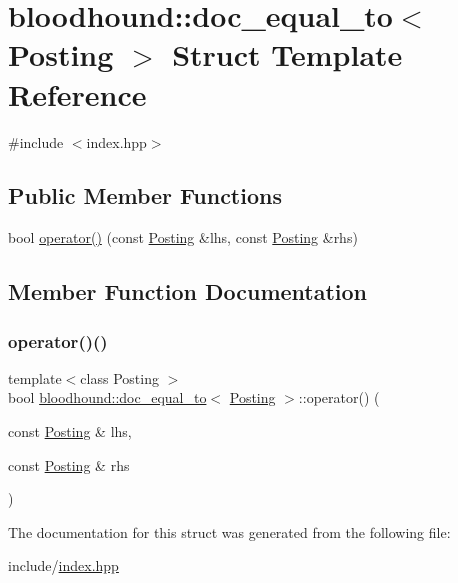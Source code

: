 \hypertarget{structbloodhound_1_1doc__equal__to}{}\section{bloodhound\+:\+:doc\+\_\+equal\+\_\+to$<$ Posting $>$ Struct Template Reference}
\label{structbloodhound_1_1doc__equal__to}


{\ttfamily \#include $<$index.\+hpp$>$}

\subsection*{Public Member Functions}
\begin{DoxyCompactItemize}
\item 
bool \hyperlink{structbloodhound_1_1doc__equal__to_a5a8e28107bb693527fa4c513b3678b1b}{operator()} (const \hyperlink{structbloodhound_1_1Posting}{Posting} \&lhs, const \hyperlink{structbloodhound_1_1Posting}{Posting} \&rhs)
\end{DoxyCompactItemize}


\subsection{Member Function Documentation}
\mbox{\label{structbloodhound_1_1doc__equal__to_a5a8e28107bb693527fa4c513b3678b1b}} 
\subsubsection{\texorpdfstring{operator()()}{operator()()}}
{\footnotesize\ttfamily template$<$class Posting $>$ \\
bool \hyperlink{structbloodhound_1_1doc__equal__to}{bloodhound\+::doc\+\_\+equal\+\_\+to}$<$ \hyperlink{structbloodhound_1_1Posting}{Posting} $>$\+::operator() (\begin{DoxyParamCaption}\item[{const \hyperlink{structbloodhound_1_1Posting}{Posting} \&}]{lhs,  }\item[{const \hyperlink{structbloodhound_1_1Posting}{Posting} \&}]{rhs }\end{DoxyParamCaption})\hspace{0.3cm}{\ttfamily [inline]}}



The documentation for this struct was generated from the following file\+:\begin{DoxyCompactItemize}
\item 
include/\hyperlink{index_8hpp}{index.\+hpp}\end{DoxyCompactItemize}
